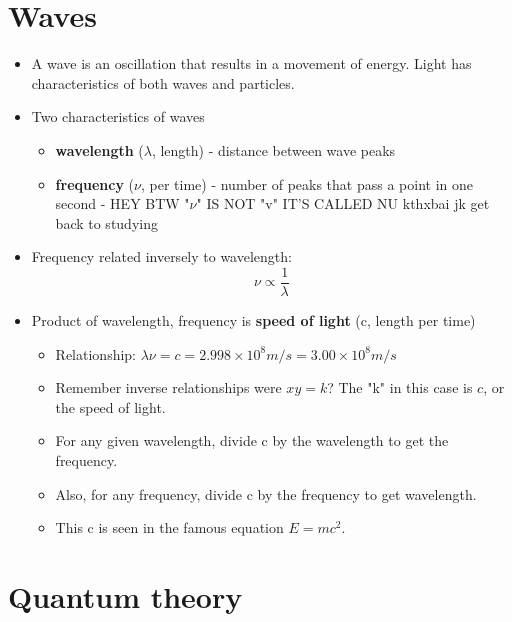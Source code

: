 \documentclass[letterpaper, 12pt]{article}
\begin{document}
\section{Waves}
	\begin{itemize}
		\item A wave is an oscillation that results in a movement of energy. Light has characteristics of both waves and particles.
		\item Two characteristics of waves
		\begin{itemize}
			\item \textbf{wavelength} ($\lambda$, length) - distance between wave peaks
			\item \textbf{frequency} ($\nu$, per time) - number of peaks that pass a point in one second - HEY BTW "$\nu$" IS NOT "v" IT'S CALLED NU kthxbai jk get back to studying
		\end{itemize}
		\item Frequency related inversely to wavelength: $$\nu \propto \frac{1}{\lambda}$$
		\item Product of wavelength, frequency is \textbf{speed of light} (c, length per time)
		\begin{itemize}
			\item Relationship: $\lambda \nu = c = 2.998 \times 10^8 m/s = 3.00 \times 10^8 m/s$
			\item Remember inverse relationships were $xy = k$? The "k" in this case is $c$, or the speed of light.
			\item For any given wavelength, divide c by the wavelength to get the frequency.
			\item Also, for any frequency, divide c by the frequency to get wavelength.
			\item This c is seen in the famous equation $E = mc^2$.
		\end{itemize}
	\end{itemize}
\section{Quantum theory}
\end{document}
